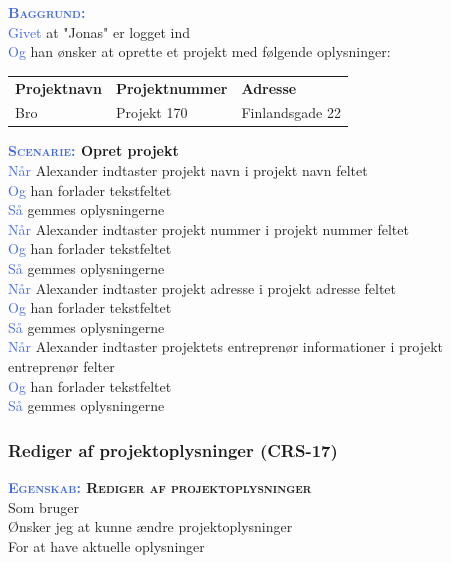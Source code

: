 \textsc{\textcolor{RoyalBlue}{\textbf{Baggrund:}}}\\
\textcolor{RoyalBlue}{Givet} at "Jonas" er logget ind\\
\textcolor{RoyalBlue}{Og} han ønsker at oprette et projekt med følgende oplysninger:\\
\begin{tabular}{| l | l | l |}
	\textbf{Projektnavn} & \textbf{Projektnummer} & \textbf{Adresse} \\
	Bro & Projekt 170 & Finlandsgade 22 \\
\end{tabular}
\newline \newline

\textbf{\textsc{\textcolor{RoyalBlue}{Scenarie:}} Opret projekt}\\
\textcolor{RoyalBlue}{Når} Alexander indtaster projekt navn i projekt navn feltet\\
\textcolor{RoyalBlue}{Og} han forlader tekstfeltet\\
\textcolor{RoyalBlue}{Så} gemmes oplysningerne\\
\textcolor{RoyalBlue}{Når} Alexander indtaster projekt nummer i projekt nummer feltet\\
\textcolor{RoyalBlue}{Og} han forlader tekstfeltet\\
\textcolor{RoyalBlue}{Så} gemmes oplysningerne\\
\textcolor{RoyalBlue}{Når} Alexander indtaster projekt adresse i projekt adresse feltet\\
\textcolor{RoyalBlue}{Og} han forlader tekstfeltet\\
\textcolor{RoyalBlue}{Så} gemmes oplysningerne\\
\textcolor{RoyalBlue}{Når} Alexander indtaster projektets entreprenør informationer i projekt entreprenør felter\\
\textcolor{RoyalBlue}{Og} han forlader tekstfeltet\\
\textcolor{RoyalBlue}{Så} gemmes oplysningerne\\

\subsubsection{Rediger af projektoplysninger (CRS-17)} \label{sec:USRedigerProjekt}
\textbf{\textsc{\textcolor{RoyalBlue}{Egenskab:} Rediger af projektoplysninger}}\\
Som bruger\\
Ønsker jeg at kunne ændre projektoplysninger\\
For at have aktuelle oplysninger

